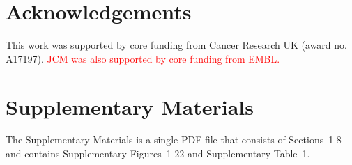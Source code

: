 \documentclass{article}
\newcommand\revised[1]{\textcolor{red}{#1}}
\newcommand{\suppsecclust}{8}
\newcommand{\suppfigclusterreal}{22}
\begin{document}
\section{Acknowledgements}
This work was supported by core funding from Cancer Research UK (award no. A17197).
\revised{JCM was also supported by core funding from EMBL.}

\section{Supplementary Materials}
The Supplementary Materials is a single PDF file that consists of Sections~1-\suppsecclust{} and contains Supplementary Figures~1-\suppfigclusterreal{} and Supplementary Table~1.



\end{document}

